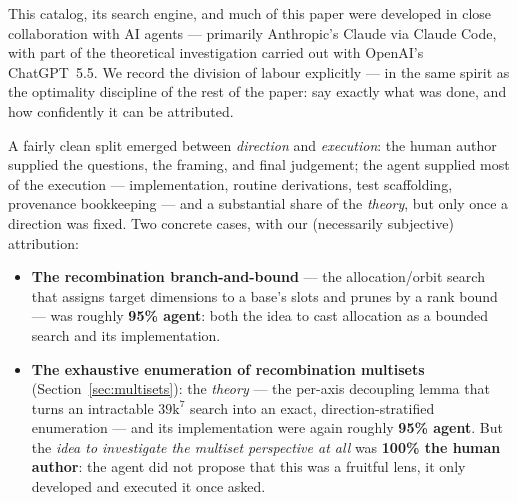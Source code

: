 
This catalog, its search engine, and much of this paper were developed in close
collaboration with AI agents --- primarily Anthropic's Claude via Claude Code, with part of
the theoretical investigation carried out with OpenAI's ChatGPT~5.5. We
record the division of labour explicitly --- in the same spirit as the
optimality discipline of the rest of the paper: say exactly what was done, and
how confidently it can be attributed.

A fairly clean split emerged between \emph{direction} and \emph{execution}: the
human author supplied the questions, the framing, and final judgement; the
agent supplied most of the execution --- implementation, routine derivations,
test scaffolding, provenance bookkeeping --- and a substantial share of the
\emph{theory}, but only once a direction was fixed. Two concrete cases, with
our (necessarily subjective) attribution:

\begin{itemize}\itemsep2pt
  \item \textbf{The recombination branch-and-bound} --- the allocation/orbit
  search that assigns target dimensions to a base's slots and prunes by a rank
  bound --- was roughly \textbf{95\% agent}: both the idea to cast allocation as
  a bounded search and its implementation.

  \item \textbf{The exhaustive enumeration of recombination multisets}
  (Section~\ref{sec:multisets}): the \emph{theory} --- the per-axis decoupling
  lemma that turns an intractable \(39\text{k}^7\) search into an exact,
  direction-stratified enumeration --- and its implementation were again roughly
  \textbf{95\% agent}. But the \emph{idea to investigate the multiset
  perspective at all} was \textbf{100\% the human author}: the agent did not
  propose that this was a fruitful lens, it only developed and executed it once
  asked.
\end{itemize}

